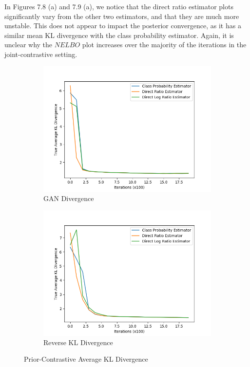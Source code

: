 \documentclass[honours,12pt]{unswthesis}
\numberwithin{equation}{section}
\theoremstyle{definition}
\begin{document}
In Figures 7.8 (a) and 7.9 (a), we notice that the direct ratio estimator plots significantly vary from the other two estimators, and that they are much more unstable. This does not appear to impact the posterior convergence, as it has a similar mean KL divergence with the class probability estimator. Again, it is unclear why the $NELBO$ plot increases over the majority of the iterations in the joint-contrastive setting.
\newpage
\begin{figure}
\begin{subfigure}{0.49\textwidth}
\includegraphics[width=\linewidth]{part2truklmins/PCADVvsPCADVexpvsPCADVgudlog.png}
\caption{GAN Divergence}
\end{subfigure}
\begin{subfigure}{0.49\textwidth}
\includegraphics[width=\linewidth]{part2truklmins/PCKLDvsPCKLexpvsPCKLgudlog.png}
\caption{Reverse KL Divergence}
\end{subfigure}
\caption{Prior-Contrastive Average KL Divergence}
\end{figure}
\end{document}
